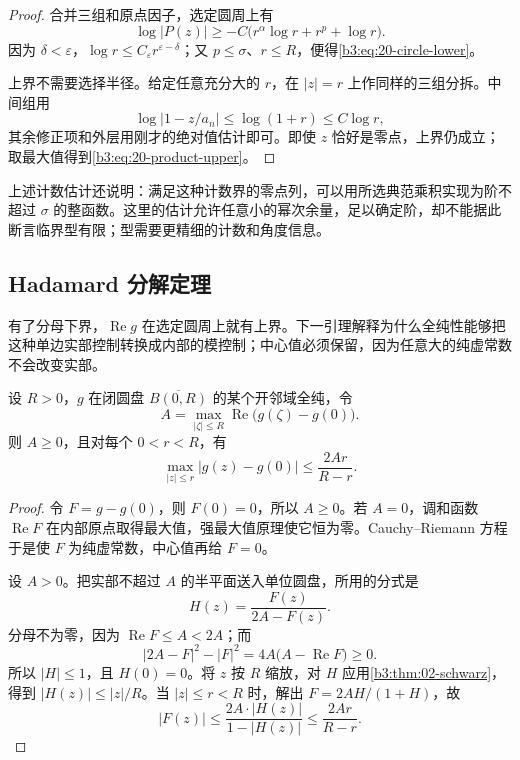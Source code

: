 \begin{proof}
合并三组和原点因子，选定圆周上有
\[
 \log|P(z)|\ge-C\bigl(r^\alpha\log r+r^p+\log r\bigr).
\]
因为 \(\delta<\varepsilon\)，\(\log r\le C_\varepsilon r^{\varepsilon-\delta}\)；又 \(p\le\sigma\)、\(r\le R\)，便得\eqref{b3:eq:20-circle-lower}。

上界不需要选择半径。给定任意充分大的 \(r\)，在 \(|z|=r\) 上作同样的三组分拆。中间组用
\[
 \log|1-z/a_n|\le\log(1+r)\le C\log r,
\]
其余修正项和外层用刚才的绝对值估计即可。即使 \(z\) 恰好是零点，上界仍成立；取最大值得到\eqref{b3:eq:20-product-upper}。
\end{proof}

上述计数估计还说明：满足这种计数界的零点列，可以用所选典范乘积实现为阶不超过 \(\sigma\) 的整函数。这里的估计允许任意小的幂次余量，足以确定阶，却不能据此断言临界型有限；型需要更精细的计数和角度信息。

\subsection{Hadamard 分解定理}
\label{b3:subsec:200503}

有了分母下界，\(\operatorname{Re}g\) 在选定圆周上就有上界。下一引理解释为什么全纯性能够把这种单边实部控制转换成内部的模控制；中心值必须保留，因为任意大的纯虚常数不会改变实部。

\begin{lemma}\label{b3:lem:20-borel-caratheodory}
设 \(R>0\)，\(g\) 在闭圆盘 \(\overline{B(0,R)}\) 的某个开邻域全纯，令
\[
 A=\max_{|\zeta|\le R}\operatorname{Re}\bigl(g(\zeta)-g(0)\bigr).
\]
则 \(A\ge0\)，且对每个 \(0<r<R\)，有
\[
 \max_{|z|\le r}|g(z)-g(0)|\le\frac{2Ar}{R-r}.
\]
\end{lemma}
\begin{proof}
令 \(F=g-g(0)\)，则 \(F(0)=0\)，所以 \(A\ge0\)。若 \(A=0\)，调和函数 \(\operatorname{Re}F\) 在内部原点取得最大值，强最大值原理使它恒为零。Cauchy--Riemann 方程于是使 \(F\) 为纯虚常数，中心值再给 \(F=0\)。

设 \(A>0\)。把实部不超过 \(A\) 的半平面送入单位圆盘，所用的分式是
\[
 H(z)=\frac{F(z)}{2A-F(z)}.
\]
分母不为零，因为 \(\operatorname{Re}F\le A<2A\)；而
\[
 |2A-F|^2-|F|^2=4A\bigl(A-\operatorname{Re}F\bigr)\ge0.
\]
所以 \(|H|\le1\)，且 \(H(0)=0\)。将 \(z\) 按 \(R\) 缩放，对 \(H\) 应用\cref{b3:thm:02-schwarz}，得到 \(|H(z)|\le|z|/R\)。当 \(|z|\le r<R\) 时，解出 \(F=2AH/(1+H)\)，故
\[
 |F(z)|\le\frac{2A\cdot|H(z)|}{1-|H(z)|}
          \le\frac{2Ar}{R-r}.
\]
\end{proof}


